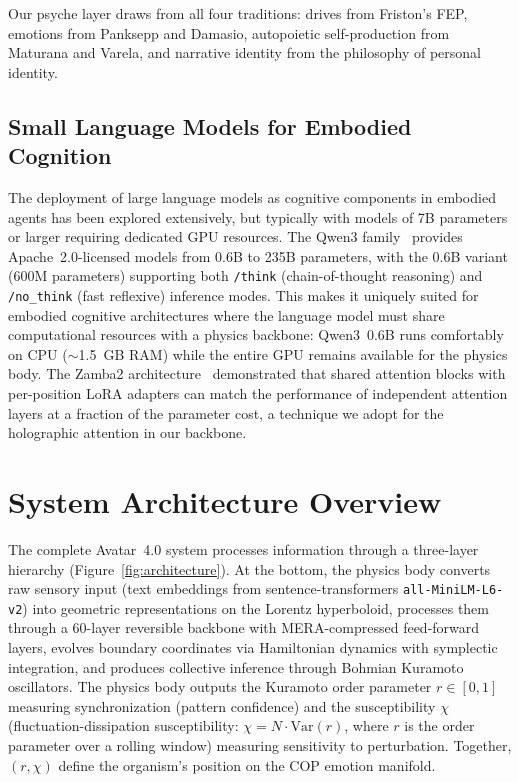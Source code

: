\documentclass[11pt,a4paper,twocolumn]{article}
\begin{document}
Our psyche layer draws from all four traditions: drives from Friston's FEP, emotions from Panksepp and Damasio, autopoietic self-production from Maturana and Varela, and narrative identity from the philosophy of personal identity.

\subsection{Small Language Models for Embodied Cognition}

The deployment of large language models as cognitive components in embodied agents has been explored extensively, but typically with models of 7B parameters or larger requiring dedicated GPU resources.
The Qwen3 family~\cite{qwen3_2026} provides Apache~2.0-licensed models from 0.6B to 235B parameters, with the 0.6B variant (600M parameters) supporting both \texttt{/think} (chain-of-thought reasoning) and \texttt{/no\_think} (fast reflexive) inference modes.
This makes it uniquely suited for embodied cognitive architectures where the language model must share computational resources with a physics backbone: Qwen3~0.6B runs comfortably on CPU ($\sim$1.5~GB RAM) while the entire GPU remains available for the physics body.
The Zamba2 architecture~\cite{zamba2024,zamba2_2024} demonstrated that shared attention blocks with per-position LoRA adapters can match the performance of independent attention layers at a fraction of the parameter cost, a technique we adopt for the holographic attention in our backbone.

\section{System Architecture Overview}

The complete Avatar~4.0 system processes information through a three-layer hierarchy (Figure~\ref{fig:architecture}).
At the bottom, the physics body converts raw sensory input (text embeddings from sentence-transformers \texttt{all-MiniLM-L6-v2}) into geometric representations on the Lorentz hyperboloid, processes them through a 60-layer reversible backbone with MERA-compressed feed-forward layers, evolves boundary coordinates via Hamiltonian dynamics with symplectic integration, and produces collective inference through Bohmian Kuramoto oscillators.
The physics body outputs the Kuramoto order parameter $r \in [0,1]$ measuring synchronization (pattern confidence) and the susceptibility $\chi$ (fluctuation-dissipation susceptibility: $\chi = N \cdot \mathrm{Var}(r)$, where $r$ is the order parameter over a rolling window) measuring sensitivity to perturbation. Together, $(r, \chi)$ define the organism's position on the COP emotion manifold.
\end{document}
